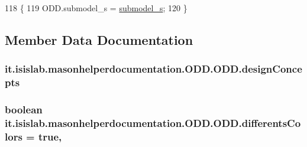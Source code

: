 \begin{DoxyCode}
118                                                             \{
119         ODD.submodel\_s = \hyperlink{classit_1_1isislab_1_1masonhelperdocumentation_1_1_o_d_d_1_1_o_d_d_a1da5e6dcf76e4a83ec91831f5ab98bf2}{submodel\_s};
120     \}
\end{DoxyCode}


\subsection{Member Data Documentation}
\hypertarget{classit_1_1isislab_1_1masonhelperdocumentation_1_1_o_d_d_1_1_o_d_d_a6be57819872ca078db4b2791ef8ddc8f}{
\subsubsection[{design\-Concepts}]{ it.\-isislab.\-masonhelperdocumentation.\-O\-D\-D.\-O\-D\-D.\-design\-Concepts\hspace{0.3cm}{\ttfamily [static]}}}\label{classit_1_1isislab_1_1masonhelperdocumentation_1_1_o_d_d_1_1_o_d_d_a6be57819872ca078db4b2791ef8ddc8f}
\hypertarget{classit_1_1isislab_1_1masonhelperdocumentation_1_1_o_d_d_1_1_o_d_d_ab09b176537cd5e168d67fc16112444dc}{
\subsubsection[{differents\-Colors}]{\setlength{\rightskip}{0pt plus 5cm}boolean it.\-isislab.\-masonhelperdocumentation.\-O\-D\-D.\-O\-D\-D.\-differents\-Colors = true\hspace{0.3cm}{\ttfamily [static]}, {\ttfamily [private]}}}\label{classit_1_1isislab_1_1masonhelperdocumentation_1_1_o_d_d_1_1_o_d_d_ab09b176537cd5e168d67fc16112444dc}
